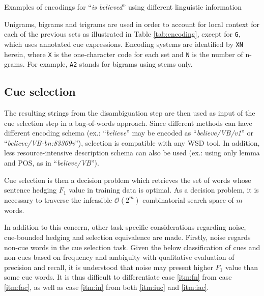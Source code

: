 \documentclass[english]{jnlp_1.4}
\begin{document}
\begin{table}[b]
\caption{Examples of encodings for ``\emph{is believed}'' using different linguistic information}
\label{tab:encoding}

\end{table}

Unigrams, bigrams and trigrams are used in order to account for local context for each of the previous sets as illustrated in Table \ref{tab:encoding}, except for \texttt{G}, which uses annotated cue expressions. Encoding systems are identified by \texttt{XN} herein, where \texttt{X} is the one-character code for each set and \texttt{N} is the number of n-grams. For example, \texttt{A2} stands for bigrams using stems only.


\subsection{Cue selection}

The resulting strings from the disambiguation step are then used as input of the cue selection step in a bag-of-words approach. Since different methods can have different encoding schema (ex.: ``\emph{believe}'' may be encoded as ``\emph{believe/VB/v1}'' or ``\emph{believe/VB-bn:83369v}''), selection is compatible with any WSD tool. In addition, less resource-intensive description schema can also be used (ex.: using only lemma and POS, as in ``\emph{believe/VB}'').

Cue selection is then a decision problem which retrieves the set of words whose sentence hedging $F_1$ value in training data is optimal. As a decision problem, it is necessary to traverse the infeasible $\mathcal{O}(2^{m})$ combinatorial search space of $m$ words.

In addition to this concern, other task-specific considerations regarding noise, cue-bounded hedging and selection equivalence are made. Firstly, noise regards non-cue words in the cue selection task. Given the below classification of cues and non-cues based on frequency and ambiguity with qualitative evaluation of precision and recall, it is understood that noise may present higher $F_1$ value than some cue words. It is thus difficult to differentiate case \ref{itm:fn} from case \ref{itm:fac}, as well as case \ref{itm:in} from both \ref{itm:iuc} and \ref{itm:iac}.
\end{document}

